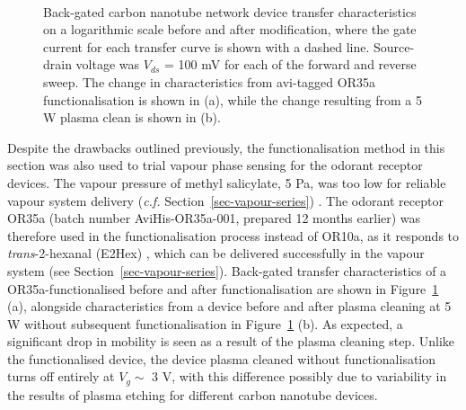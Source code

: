 \documentclass[
  a4paper,
]{scrbook}
\begin{document}
\begin{figure}
\begin{minipage}[t]{0.45\linewidth}
{{}

}

\end{minipage}%
%
\begin{minipage}[t]{0.01\linewidth}

{\centering 

~

}

\end{minipage}%

\caption{\label{fig-OR35a-TX-comparison}Back-gated carbon nanotube
network device transfer characteristics on a logarithmic scale before
and after modification, where the gate current for each transfer curve
is shown with a dashed line. Source-drain voltage was \(V_{ds}\) = 100
mV for each of the forward and reverse sweep. The change in
characteristics from avi-tagged OR35a functionalisation is shown in (a),
while the change resulting from a 5 W plasma clean is shown in (b).}

\end{figure}

Despite the drawbacks outlined previously, the functionalisation method
in this section was also used to trial vapour phase sensing for the
odorant receptor devices. The vapour pressure of methyl salicylate, 5
Pa, was too low for reliable vapour system delivery (\emph{c.f.}
Section~\ref{sec-vapour-series}) \autocite{MeSal}. The odorant receptor
OR35a (batch number AviHis-OR35a-001, prepared 12 months earlier) was
therefore used in the functionalisation process instead of OR10a, as it
responds to \emph{trans}-2-hexanal (E2Hex) \autocite{Murugathas2019a},
which can be delivered successfully in the vapour system (see
Section~\ref{sec-vapour-series}). Back-gated transfer characteristics of
a OR35a-functionalised before and after functionalisation are shown in
Figure~\ref{fig-OR35a-TX-comparison} (a), alongside characteristics from
a device before and after plasma cleaning at 5 W without subsequent
functionalisation in Figure~\ref{fig-OR35a-TX-comparison} (b). As
expected, a significant drop in mobility is seen as a result of the
plasma cleaning step. Unlike the functionalised device, the device
plasma cleaned without functionalisation turns off entirely at
\(V_g \sim\) 3 V, with this difference possibly due to variability in
the results of plasma etching for different carbon nanotube devices.
\end{document}
